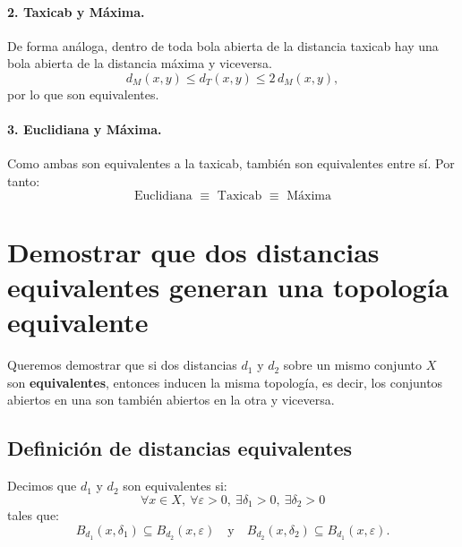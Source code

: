 \documentclass[12pt]{article}
\begin{document}
\paragraph{2. Taxicab y Máxima.}
De forma análoga, dentro de toda bola abierta de la distancia taxicab
hay una bola abierta de la distancia máxima y viceversa.
\[
d_M(x,y) \le d_T(x,y) \le 2\,d_M(x,y),
\]
por lo que son equivalentes.

\begin{center}
\end{center}

\paragraph{3. Euclidiana y Máxima.}
Como ambas son equivalentes a la taxicab, también son equivalentes entre sí.  
Por tanto:
\[
\boxed{\text{Euclidiana } \equiv \text{ Taxicab } \equiv \text{ Máxima}}
\]

\begin{center}
\end{center}
\section*{Demostrar que dos distancias equivalentes generan una topología equivalente}

Queremos demostrar que si dos distancias \( d_1 \) y \( d_2 \) sobre un mismo conjunto \( X \)
son \textbf{equivalentes}, entonces inducen la misma topología, es decir,
los conjuntos abiertos en una son también abiertos en la otra y viceversa.

\subsection*{Definición de distancias equivalentes}
Decimos que \( d_1 \) y \( d_2 \) son equivalentes si:
\[
\forall x \in X, \ \forall \varepsilon > 0, \ \exists \delta_1 > 0, \ \exists \delta_2 > 0
\]
tales que:
\[
B_{d_1}(x, \delta_1) \subseteq B_{d_2}(x, \varepsilon)
\quad \text{y} \quad
B_{d_2}(x, \delta_2) \subseteq B_{d_1}(x, \varepsilon).
\]
\end{document}
